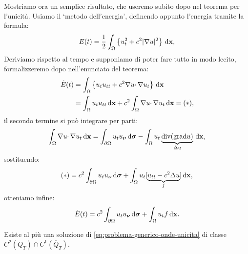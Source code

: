 Mostriamo ora un semplice risultato, che useremo subito dopo nel teorema per l'unicità. Usiamo il `metodo dell'energia', definendo appunto l'energia tramite la formula:
\begin{equation}
    E(t) =\frac{1}{2}\int _{\Omega }\left\{u_{t}^{2} +c^{2}| \nabla u| ^{2}\right\} \,\mathrm d \mathbf{x} ,
\end{equation}
Deriviamo rispetto al tempo e supponiamo di poter fare tutto in modo lecito, formalizzeremo dopo nell'enunciato del teorema:
\begin{align*}
    \dot{E}(t) & =\int _{\Omega }\left\{u_{t} u_{tt} +c^{2} \nabla u\cdotp \nabla u_{t}\right\} \,\mathrm d \mathbf{x}              \\
               & =\int _{\Omega } u_{t} u_{tt} \,\mathrm d \mathbf{x} +c^{2}\int _{\Omega } \nabla u\cdotp \nabla u_{t} \,\mathrm d \mathbf{x} =(*) ,
\end{align*}
il secondo termine si può integrare per parti:
\begin{equation*}
    \int _{\Omega } \nabla u\cdotp \nabla u_{t} \,\mathrm d \mathbf{x} =\int _{\partial \Omega } u_{t} u_{\bm{\nu }} \,\mathrm d \bm{\sigma} -\int _{\Omega } u_{t}\underbrace{\mathrm{div}(\mathrm{grad} u)}_{\Delta u} \,\mathrm d \mathbf{x} ,
\end{equation*}
sostituendo:
\begin{equation*}
    (*) =c^{2}\int _{\partial \Omega } u_{t} u_{\bm{\nu }} \,\mathrm d \bm{\sigma} +\int _{\Omega } u_{t}[\underbrace{u_{tt} -c^{2} \Delta u}_{f}] \,\mathrm d \mathbf{x} ,
\end{equation*}
otteniamo infine:
\begin{equation}
    \dot{E}(t) =c^{2}\int _{\partial \Omega } u_{t} u_{\bm{\nu }} \,\mathrm d \bm{\sigma} +\int _{\Omega } u_{t} f\,\mathrm d \mathbf{x} .
    \label{eq:onde-derivata-energia}
\end{equation}
\begin{theorem}
    Esiste al più una soluzione di \eqref{eq:problema-generico-onde-unicita} di classe $C^{2}(Q_{T}) \cap C^{1}(\overline{Q}_{T})$.
\end{theorem}
